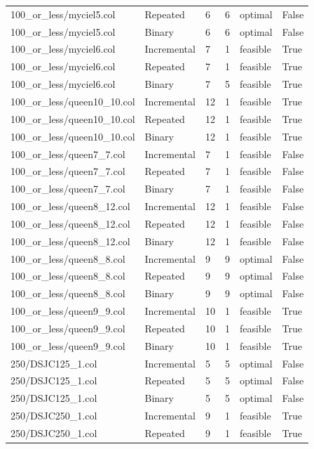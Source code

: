 \begin{table}[htbp]
\begin{tabular}{llllll}
100\_or\_less/myciel5.col & Repeated & 6 & 6 & optimal & False \\
100\_or\_less/myciel5.col & Binary & 6 & 6 & optimal & False \\
100\_or\_less/myciel6.col & Incremental & 7 & 1 & feasible & True \\
100\_or\_less/myciel6.col & Repeated & 7 & 1 & feasible & True \\
100\_or\_less/myciel6.col & Binary & 7 & 5 & feasible & True \\
100\_or\_less/queen10\_10.col & Incremental & 12 & 1 & feasible & True \\
100\_or\_less/queen10\_10.col & Repeated & 12 & 1 & feasible & True \\
100\_or\_less/queen10\_10.col & Binary & 12 & 1 & feasible & True \\
100\_or\_less/queen7\_7.col & Incremental & 7 & 1 & feasible & False \\
100\_or\_less/queen7\_7.col & Repeated & 7 & 1 & feasible & False \\
100\_or\_less/queen7\_7.col & Binary & 7 & 1 & feasible & False \\
100\_or\_less/queen8\_12.col & Incremental & 12 & 1 & feasible & False \\
100\_or\_less/queen8\_12.col & Repeated & 12 & 1 & feasible & False \\
100\_or\_less/queen8\_12.col & Binary & 12 & 1 & feasible & False \\
100\_or\_less/queen8\_8.col & Incremental & 9 & 9 & optimal & False \\
100\_or\_less/queen8\_8.col & Repeated & 9 & 9 & optimal & False \\
100\_or\_less/queen8\_8.col & Binary & 9 & 9 & optimal & False \\
100\_or\_less/queen9\_9.col & Incremental & 10 & 1 & feasible & True \\
100\_or\_less/queen9\_9.col & Repeated & 10 & 1 & feasible & True \\
100\_or\_less/queen9\_9.col & Binary & 10 & 1 & feasible & True \\
250/DSJC125\_1.col & Incremental & 5 & 5 & optimal & False \\
250/DSJC125\_1.col & Repeated & 5 & 5 & optimal & False \\
250/DSJC125\_1.col & Binary & 5 & 5 & optimal & False \\
250/DSJC250\_1.col & Incremental & 9 & 1 & feasible & True \\
250/DSJC250\_1.col & Repeated & 9 & 1 & feasible & True \\

\end{tabular}
\end{table}
